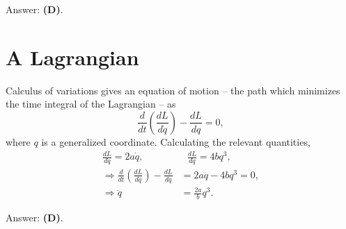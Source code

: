 \documentclass[11pt]{paper}
\newcommand{\answer}[1]{Answer: \textbf{(#1)}.}
\begin{document}
\answer{D}


\section{A Lagrangian}
Calculus of variations gives an equation of motion \--- the path which minimizes the time integral of the Lagrangian \--- as
\begin{equation}
\frac{d}{dt}\left(\frac{d L}{d\dot{q}}\right) - \frac{dL}{dq} = 0,
\end{equation}
where $q$ is a generalized coordinate.  Calculating the relevant quantities,
\begin{align}
\frac{d L}{d\dot{q}} = 2a\dot{q}, &\text{	} \frac{dL}{dq} = 4bq^3,\\
\Rightarrow\frac{d}{dt}\left(\frac{d L}{d\dot{q}}\right) - \frac{dL}{dq} &= 2a\ddot{q} - 4bq^3 = 0,\\
\Rightarrow\ddot{q} &= \frac{2a}{b}q^3.
\end{align}

\answer{D}
\end{document}
